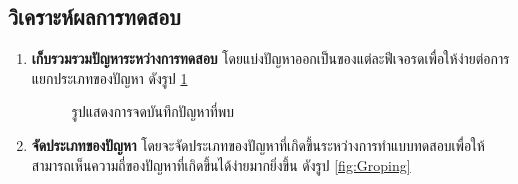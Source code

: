 \subsection{วิเคราะห์ผลการทดสอบ}
\begin{enumerate}
    \item \textbf{เก็บรวมรวมปัญหาระหว่างการทดสอบ} โดยแบ่งปัญหาออกเป็นของแต่ละฟีเจอรดเพื่อให้ง่ายต่อการแยกประเภทของปัญหา ดังรูป \ref{fig:GateringIssue}
          \begin{figure}[H]\centering
              \caption{รูปแสดงการจดบันทึกปัญหาที่พบ}\label{fig:GateringIssue}
          \end{figure}
    \item \textbf{จัดประเภทของปัญหา} โดยจะจัดประเภทของปัญหาที่เกิดขึ้นระหว่างการทำแบบทดสอบเพื่อให้สามารถเห็นความถี่ของปัญหาที่เกิดขึ้นได้ง่ายมากยิ่งขึ้น ดังรูป \ref{fig:Groping}

\end{enumerate}
